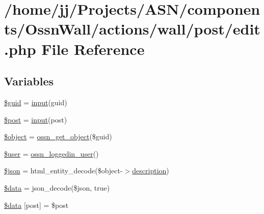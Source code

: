 \hypertarget{components_2_ossn_wall_2actions_2wall_2post_2edit_8php}{}\section{/home/jj/\+Projects/\+A\+S\+N/components/\+Ossn\+Wall/actions/wall/post/edit.php File Reference}
\label{components_2_ossn_wall_2actions_2wall_2post_2edit_8php}
\subsection*{Variables}
\begin{DoxyCompactItemize}
\item 
\hyperlink{components_2_ossn_wall_2actions_2wall_2post_2edit_8php_af99126304cbcb2e1483892c40bb3aae4}{\$guid} = \hyperlink{ossn_8lib_8input_8php_a64ebee98b041c4f75f71ed3cd73cc8ed}{input}(\textquotesingle{}guid\textquotesingle{})
\item 
\hyperlink{components_2_ossn_wall_2actions_2wall_2post_2edit_8php_a435399a950093c54baf29ad4c1e52e79}{\$post} = \hyperlink{ossn_8lib_8input_8php_a64ebee98b041c4f75f71ed3cd73cc8ed}{input}(\textquotesingle{}post\textquotesingle{})
\item 
\hyperlink{components_2_ossn_wall_2actions_2wall_2post_2edit_8php_a52123b83a1952a68c5513e47d59ec4a6}{\$object} = \hyperlink{ossn_8lib_8objects_8php_a6b5970320e8ed1af1b6f863e7ad51f01}{ossn\+\_\+get\+\_\+object}(\$guid)
\item 
\hyperlink{components_2_ossn_wall_2actions_2wall_2post_2edit_8php_a598ca4e71b15a1313ec95f0df1027ca5}{\$user} = \hyperlink{ossn_8lib_8users_8php_aa3c8068d0e6638b414d6a2f6c62565b8}{ossn\+\_\+loggedin\+\_\+user}()
\item 
\hyperlink{components_2_ossn_wall_2actions_2wall_2post_2edit_8php_acedd13b51401130848ce18f4d5c52605}{\$json} = html\+\_\+entity\+\_\+decode(\$object-\/$>$\hyperlink{components_2_ossn_wall_2actions_2wall_2post_2edit_8php_a7f60fcaa72b0968e6b6bd7d819fa6fd9}{description})
\item 
\hyperlink{components_2_ossn_wall_2actions_2wall_2post_2edit_8php_a6efc15b5a2314dd4b5aaa556a375c6d6}{\$data} = json\+\_\+decode(\$json, true)
\item 
\hyperlink{components_2_ossn_wall_2actions_2wall_2post_2edit_8php_a2636a59d3992e952f52b5efbdd7fd57f}{\$data} \mbox{[}\textquotesingle{}post\textquotesingle{}\mbox{]} = \$post

\end{DoxyCompactItemize}

